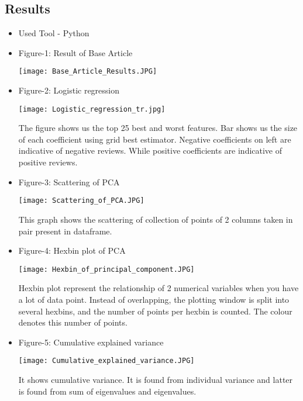 \documentclass{article}
\begin{document}
\subsection{Results}
\begin{itemize}
    \item Used Tool - Python
    
    \item  Figure-1: Result of Base Article
    \begin{center}
        \texttt{[image: Base\_Article\_Results.JPG]}
    \end{center}
    
    \item  Figure-2:  Logistic regression
    \begin{center}
         \texttt{[image: Logistic\_regression\_tr.jpg]}
    \end{center}
    The figure shows us the top 25 best and worst features. Bar shows us the size of each coefficient using grid best estimator. Negative coefficients on left are indicative of negative reviews. While positive coefficients are indicative of positive reviews.
    
    \item  Figure-3: Scattering of PCA
    \begin{center}
         \texttt{[image: Scattering\_of\_PCA.JPG]}
    \end{center}
     This graph shows the scattering of collection of points of 2 columns taken in pair present in dataframe.
    
    \item  Figure-4: Hexbin plot of PCA
    \begin{center}
        \texttt{[image: Hexbin\_of\_principal\_component.JPG]}
    \end{center}
    Hexbin plot represent the relationship of 2 numerical variables when you have a lot of data point. Instead of overlapping, the plotting window is split into several hexbins, and the number of points per hexbin is counted. The colour denotes this number of points.
    
    \item  Figure-5: Cumulative explained variance
     \begin{center}
         \texttt{[image: Cumulative\_explained\_variance.JPG]}
     \end{center}
     It shows cumulative variance. It is found from individual variance and latter is found from sum of eigenvalues and eigenvalues.
    

\end{itemize}
\end{document}
